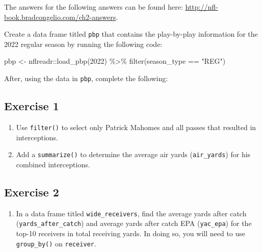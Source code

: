 \documentclass[
  letterpaper,
]{krantz}
\newenvironment{Shaded}{\begin{snugshade}}{\end{snugshade}}
\newcommand{\DecValTok}[1]{\textcolor[rgb]{0.68,0.00,0.00}{#1}}
\newcommand{\FunctionTok}[1]{\textcolor[rgb]{0.28,0.35,0.67}{#1}}
\newcommand{\NormalTok}[1]{\textcolor[rgb]{0.00,0.23,0.31}{#1}}
\newcommand{\OtherTok}[1]{\textcolor[rgb]{0.00,0.23,0.31}{#1}}
\newcommand{\SpecialCharTok}[1]{\textcolor[rgb]{0.37,0.37,0.37}{#1}}
\newcommand{\StringTok}[1]{\textcolor[rgb]{0.13,0.47,0.30}{#1}}
\providecommand{\tightlist}{%
  \setlength{\itemsep}{0pt}\setlength{\parskip}{0pt}}\usepackage{longtable,booktabs,array}
\begin{document}
The answers for the following answers can be found here:
\url{http://nfl-book.bradcongelio.com/ch2-answers}.

Create a data frame titled \texttt{pbp} that contains the play-by-play
information for the 2022 regular season by running the following code:

\begin{Shaded}
\begin{Highlighting}[]
\NormalTok{pbp }\OtherTok{\textless{}{-}}\NormalTok{ nflreadr}\SpecialCharTok{::}\FunctionTok{load\_pbp}\NormalTok{(}\DecValTok{2022}\NormalTok{) }\SpecialCharTok{\%\textgreater{}\%}
  \FunctionTok{filter}\NormalTok{(season\_type }\SpecialCharTok{==} \StringTok{"REG"}\NormalTok{)}
\end{Highlighting}
\end{Shaded}

After, using the data in \texttt{pbp}, complete the following:

\hypertarget{exercise-1}{%
\subsection{\texorpdfstring{\textbf{Exercise
1}}{Exercise 1}}\label{exercise-1}}

\begin{enumerate}
\def\labelenumi{\arabic{enumi}.}
\tightlist
\item
  Use \texttt{filter()} to select only Patrick Mahomes and all passes
  that resulted in interceptions.
\item
  Add a \texttt{summarize()} to determine the average air yards
  (\texttt{air\_yards}) for his combined interceptions.
\end{enumerate}

\hypertarget{exercise-2}{%
\subsection{\texorpdfstring{\textbf{Exercise
2}}{Exercise 2}}\label{exercise-2}}

\begin{enumerate}
\def\labelenumi{\arabic{enumi}.}
\tightlist
\item
  In a data frame titled \texttt{wide\_receivers}, find the average
  yards after catch (\texttt{yards\_after\_catch}) and average yards
  after catch EPA (\texttt{yac\_epa}) for the top-10 receivers in total
  receiving yards. In doing so, you will need to use
  \texttt{group\_by()} on \texttt{receiver}.
\end{enumerate}
\end{document}
